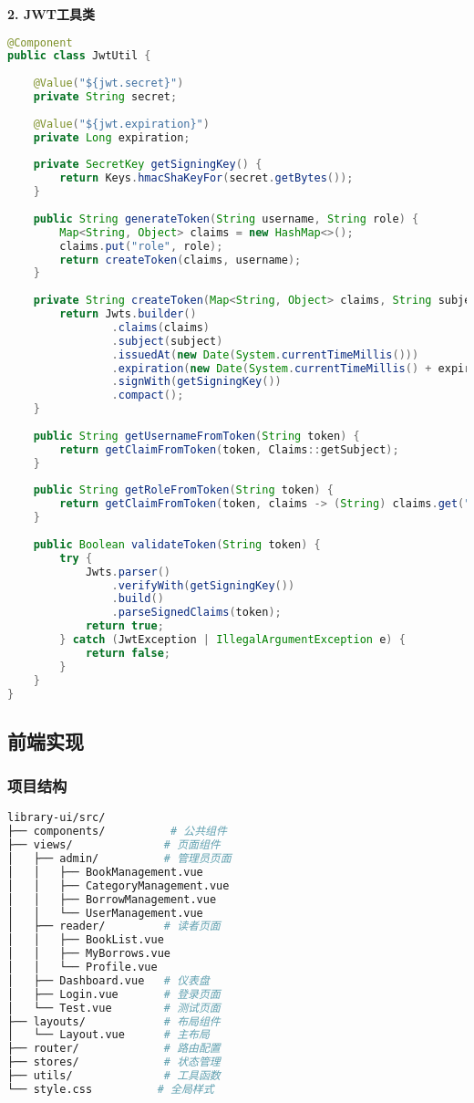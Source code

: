\documentclass[12pt,a4paper]{article}
\begin{document}
\textbf{2. JWT工具类}
\begin{lstlisting}[language=java]
@Component
public class JwtUtil {
    
    @Value("${jwt.secret}")
    private String secret;
    
    @Value("${jwt.expiration}")
    private Long expiration;
    
    private SecretKey getSigningKey() {
        return Keys.hmacShaKeyFor(secret.getBytes());
    }
    
    public String generateToken(String username, String role) {
        Map<String, Object> claims = new HashMap<>();
        claims.put("role", role);
        return createToken(claims, username);
    }
    
    private String createToken(Map<String, Object> claims, String subject) {
        return Jwts.builder()
                .claims(claims)
                .subject(subject)
                .issuedAt(new Date(System.currentTimeMillis()))
                .expiration(new Date(System.currentTimeMillis() + expiration))
                .signWith(getSigningKey())
                .compact();
    }
    
    public String getUsernameFromToken(String token) {
        return getClaimFromToken(token, Claims::getSubject);
    }
    
    public String getRoleFromToken(String token) {
        return getClaimFromToken(token, claims -> (String) claims.get("role"));
    }
    
    public Boolean validateToken(String token) {
        try {
            Jwts.parser()
                .verifyWith(getSigningKey())
                .build()
                .parseSignedClaims(token);
            return true;
        } catch (JwtException | IllegalArgumentException e) {
            return false;
        }
    }
}
\end{lstlisting}

\subsection{前端实现}

\subsubsection{项目结构}
\begin{lstlisting}[language=bash]
library-ui/src/
├── components/          # 公共组件
├── views/              # 页面组件
│   ├── admin/          # 管理员页面
│   │   ├── BookManagement.vue
│   │   ├── CategoryManagement.vue
│   │   ├── BorrowManagement.vue
│   │   └── UserManagement.vue
│   ├── reader/         # 读者页面
│   │   ├── BookList.vue
│   │   ├── MyBorrows.vue
│   │   └── Profile.vue
│   ├── Dashboard.vue   # 仪表盘
│   ├── Login.vue       # 登录页面
│   └── Test.vue        # 测试页面
├── layouts/            # 布局组件
│   └── Layout.vue      # 主布局
├── router/             # 路由配置
├── stores/             # 状态管理
├── utils/              # 工具函数
└── style.css          # 全局样式
\end{lstlisting}
\end{document}
